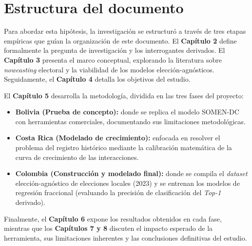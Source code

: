 \section{Estructura del documento}

Para abordar esta hipótesis, la investigación se estructuró a través de tres etapas empíricas que guían la organización de este documento. El \textbf{Capítulo 2} define formalmente la pregunta de investigación y los interrogantes derivados. El \textbf{Capítulo 3} presenta el marco conceptual, explorando la literatura sobre \textit{nowcasting} electoral y la viabilidad de los modelos elección-agnósticos. Seguidamente, el \textbf{Capítulo 4} detalla los objetivos del estudio.

El \textbf{Capítulo 5} desarrolla la metodología, dividida en las tres fases del proyecto: 
\begin{itemize}
    \item \textbf{Bolivia (Prueba de concepto):} donde se replica el modelo SOMEN-DC con herramientas comerciales, documentando sus limitaciones metodológicas.
    \item \textbf{Costa Rica (Modelado de crecimiento):} enfocada en resolver el problema del registro histórico mediante la calibración matemática de la curva de crecimiento de las interacciones.
    \item \textbf{Colombia (Construcción y modelado final):} donde se compila el \textit{dataset} elección-agnóstico de elecciones locales (2023) y se entrenan los modelos de regresión fraccional (evaluando la precisión de clasificación del \textit{Top-1} derivado).
\end{itemize}

Finalmente, el \textbf{Capítulo 6} expone los resultados obtenidos en cada fase, mientras que los \textbf{Capítulos 7 y 8} discuten el impacto esperado de la herramienta, sus limitaciones inherentes y las conclusiones definitivas del estudio.
